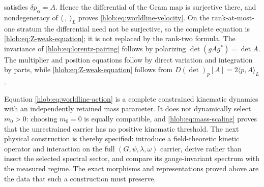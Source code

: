 satisfies \(\delta p_\alpha=A\).  Hence the differential of the Gram map is
surjective there, and nondegeneracy of \(\langle\ ,\ \rangle_L\) proves
\eqref{hlob:eq:worldline-velocity}.  On the rank-at-most-one stratum the
differential need not be surjective, so the complete equation is
\eqref{hlob:eq:Z-weak-equation}; it is not replaced by the rank-two formula.
The invariance of \eqref{hlob:eq:lorentz-pairing} follows by polarizing
\(\det(gAg^*)=\det A\).  The multiplier and position equations follow by
direct variation and integration by parts, while
\eqref{hlob:eq:Z-weak-equation} follows from
\(D(\det)_p[A]=2\langle p,A\rangle_L\).

Equation \eqref{hlob:eq:worldline-action} is a complete constrained
kinematic dynamics with an independently retained mass parameter.  It does
not dynamically select \(m_0>0\): choosing \(m_0=0\) is equally compatible,
and \eqref{hlob:eq:mass-scaling} proves that the unrestrained carrier has no
positive kinematic threshold.  The next physical construction is thereby
specified: introduce a field-theoretic kinetic operator and interaction on
the full \((G,\psi,\lambda,\omega)\) carrier, derive rather than insert the
selected spectral sector, and compare its gauge-invariant spectrum with the
measured regime.  The exact morphisms and representations proved above are
the data that such a construction must preserve.
